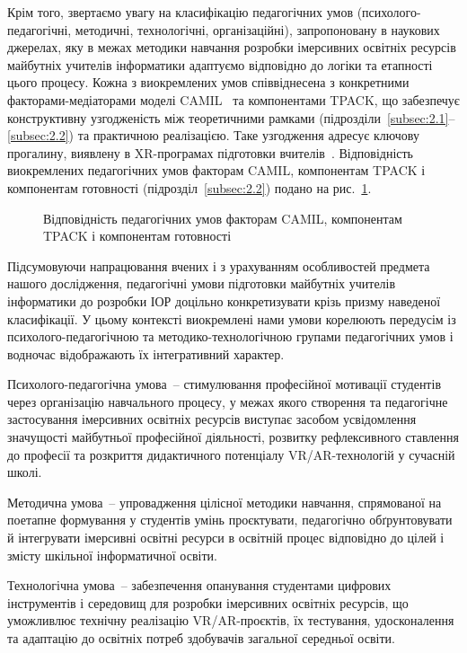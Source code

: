 Крім того, звертаємо увагу на класифікацію педагогічних умов (психолого-педагогічні, методичні, технологічні, організаційні), запропоновану в наукових джерелах, яку в межах методики навчання розробки імерсивних освітніх ресурсів майбутніх учителів інформатики адаптуємо відповідно до логіки та етапності цього процесу. Кожна з виокремлених умов співвіднесена з конкретними факторами-медіаторами моделі CAMIL~\cite{Makransky2021CAMIL} та компонентами TPACK, що забезпечує конструктивну узгодженість між теоретичними рамками (підрозділи~\ref{subsec:2.1}--\ref{subsec:2.2}) та практичною реалізацією. Таке узгодження адресує ключову прогалину, виявлену в XR-програмах підготовки вчителів~\cite{Wang2024XRTeacherEd}. Відповідність виокремлених педагогічних умов факторам CAMIL, компонентам TPACK і компонентам готовності (підрозділ~\ref{subsec:2.2}) подано на рис.~\ref{fig:conditions_alignment}.

\begin{figure}[!h]
\centering

\caption{Відповідність педагогічних умов факторам CAMIL, компонентам TPACK і компонентам готовності}
\label{fig:conditions_alignment}
\end{figure}

Підсумовуючи напрацювання вчених і з урахуванням особливостей предмета нашого дослідження, педагогічні умови підготовки майбутніх учителів інформатики до розробки ІОР доцільно конкретизувати крізь призму наведеної класифікації. У цьому контексті виокремлені нами умови корелюють передусім із психолого-педагогічною та методико-технологічною групами педагогічних умов і водночас відображають їх інтегративний характер.

Психолого-педагогічна умова~-- стимулювання професійної мотивації студентів через організацію навчального процесу, у межах якого створення та педагогічне застосування імерсивних освітніх ресурсів виступає засобом усвідомлення значущості майбутньої професійної діяльності, розвитку рефлексивного ставлення до професії та розкриття дидактичного потенціалу VR/AR-технологій у сучасній школі.

Методична умова~-- упровадження цілісної методики навчання, спрямованої на поетапне формування у студентів умінь проєктувати, педагогічно обґрунтовувати й інтегрувати імерсивні освітні ресурси в освітній процес відповідно до цілей і змісту шкільної інформатичної освіти.

Технологічна умова~-- забезпечення опанування студентами цифрових інструментів і середовищ для розробки імерсивних освітніх ресурсів, що уможливлює технічну реалізацію VR/AR-проєктів, їх тестування, удосконалення та адаптацію до освітніх потреб здобувачів загальної середньої освіти.

